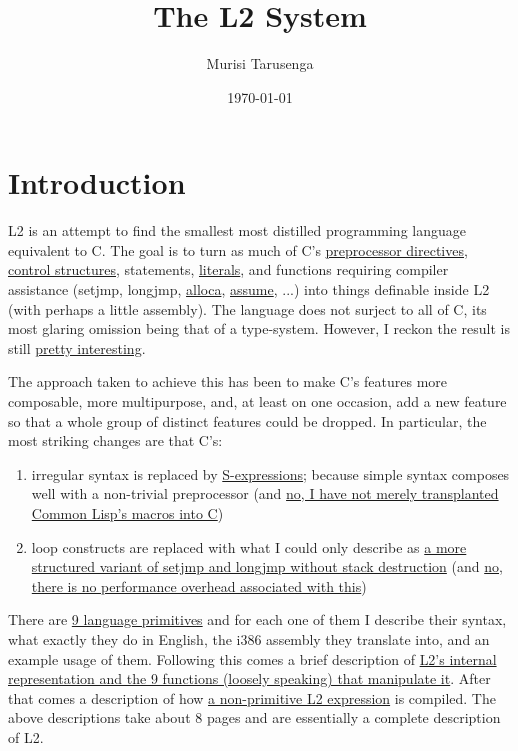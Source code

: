 \documentclass[twocolumn,landscape]{article}
\begin{document}
  \title{The L2 System}
  \author{Murisi Tarusenga}
  \date{\today{} \currenttime}
  \maketitle
  \section{Introduction}\label{sec:introduction}
    L2 is an attempt to find the smallest most distilled programming language equivalent to C. The goal is to turn as much of C's \hyperref[sec:conditional-compilation]{preprocessor directives}, \hyperref[sec:switch-expression]{control structures}, statements, \hyperref[sec:strings]{literals}, and functions requiring compiler assistance (setjmp, longjmp, \hyperref[sec:examples]{alloca}, \hyperref[sec:assume]{assume}, ...) into things definable inside L2 (with perhaps a little assembly). The language does not surject to all of C, its most glaring omission being that of a type-system. However, I reckon the result is still \hyperref[sec:closures]{pretty interesting}.

    The approach taken to achieve this has been to make C's features more composable, more multipurpose, and, at least on one occasion, add a new feature so that a whole group of distinct features could be dropped. In particular, the most striking changes are that C's:
    \begin{enumerate}
      \item irregular syntax is replaced by \hyperref[sec:internal-representation]{S-expressions}; because simple syntax composes well with a non-trivial preprocessor (and \hyperref[sec:expression]{no, I have not merely transplanted Common Lisp's macros into C})
      \item loop constructs are replaced with what I could only describe as \hyperref[sec:with]{a more structured variant of setjmp and longjmp without stack destruction} (and \hyperref[sec:an-optimization]{no, there is no performance overhead associated with this})
    \end{enumerate}

    There are \hyperref[sec:primitive-expressions]{9 language primitives} and for each one of them I describe their syntax, what exactly they do in English, the i386 assembly they translate into, and an example usage of them. Following this comes a brief description of \hyperref[sec:internal-representation]{L2's internal representation and the 9 functions (loosely speaking) that manipulate it}. After that comes a description of how \hyperref[sec:expression]{a non-primitive L2 expression} is compiled. The above descriptions take about 8 pages and are essentially a complete description of L2.
\end{document}
